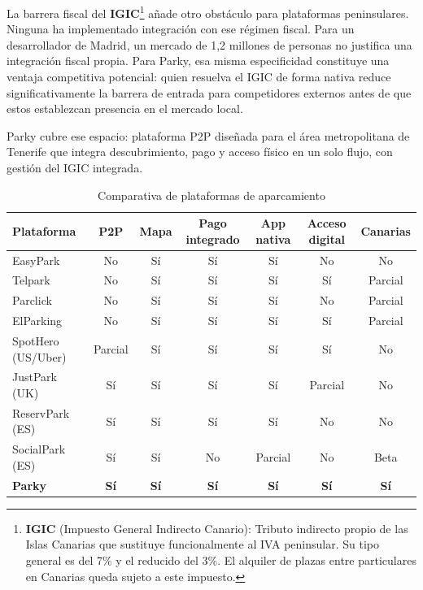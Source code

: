 La barrera fiscal del \textbf{IGIC}\footnote{\textbf{IGIC} (Impuesto General Indirecto Canario): Tributo indirecto propio de las Islas Canarias que sustituye funcionalmente al IVA peninsular. Su tipo general es del 7\% y el reducido del 3\%. El alquiler de plazas entre particulares en Canarias queda sujeto a este impuesto.} añade otro obstáculo para plataformas peninsulares. Ninguna ha implementado integración con ese régimen fiscal. Para un desarrollador de Madrid, un mercado de 1,2 millones de personas no justifica una integración fiscal propia. Para Parky, esa misma especificidad constituye una ventaja competitiva potencial: quien resuelva el IGIC de forma nativa reduce significativamente la barrera de entrada para competidores externos antes de que estos establezcan presencia en el mercado local.

Parky cubre ese espacio: plataforma P2P diseñada para el área metropolitana de Tenerife que integra descubrimiento, pago y acceso físico en un solo flujo, con gestión del IGIC integrada.

\begin{table}[H]
  \centering
  \caption{Comparativa de plataformas de aparcamiento}
  \label{tab:competidores}
  \begin{tabularx}{\textwidth}{lCCCCCC}
    \toprule
    \textbf{Plataforma} & \textbf{P2P}            & \textbf{Mapa}
                        & \textbf{Pago integrado} & \textbf{App nativa}
                        & \textbf{Acceso digital} & \textbf{Canarias}                                               \\
    \midrule
    EasyPark            & No                      & Sí                  & Sí          & Sí      & No      & No      \\
    Telpark             & No                      & Sí                  & Sí          & Sí      & Sí      & Parcial \\
    Parclick            & No                      & Sí                  & Sí          & Sí      & No      & Parcial \\
    ElParking           & No                      & Sí                  & Sí          & Sí      & Sí      & Parcial \\
    SpotHero (US/Uber)  & Parcial                 & Sí                  & Sí          & Sí      & Sí      & No      \\
    JustPark (UK)       & Sí                      & Sí                  & Sí          & Sí      & Parcial & No      \\
    ReservPark (ES)     & Sí                      & Sí                  & Sí          & Sí      & No      & No      \\
    SocialPark (ES)     & Sí                      & Sí                  & No          & Parcial & No      & Beta    \\
    \textbf{Parky}      & \textbf{Sí}             & \textbf{Sí}         & \textbf{Sí}
                        & \textbf{Sí}             & \textbf{Sí}         & \textbf{Sí}                               \\
    \bottomrule
  \end{tabularx}
\end{table}

